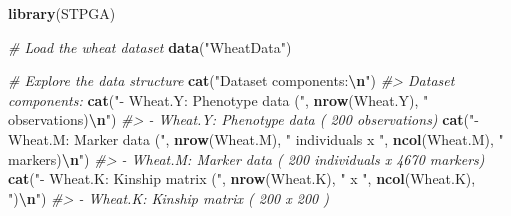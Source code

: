 \documentclass[
]{article}
\newenvironment{Shaded}{\begin{snugshade}}{\end{snugshade}}
\newcommand{\CommentTok}[1]{\textcolor[rgb]{0.56,0.35,0.01}{\textit{#1}}}
\newcommand{\FunctionTok}[1]{\textcolor[rgb]{0.13,0.29,0.53}{\textbf{#1}}}
\newcommand{\NormalTok}[1]{#1}
\newcommand{\SpecialCharTok}[1]{\textcolor[rgb]{0.81,0.36,0.00}{\textbf{#1}}}
\newcommand{\StringTok}[1]{\textcolor[rgb]{0.31,0.60,0.02}{#1}}
\begin{document}
\begin{Shaded}
\begin{Highlighting}[]
\FunctionTok{library}\NormalTok{(STPGA)}

\CommentTok{\# Load the wheat dataset}
\FunctionTok{data}\NormalTok{(}\StringTok{"WheatData"}\NormalTok{)}

\CommentTok{\# Explore the data structure}
\FunctionTok{cat}\NormalTok{(}\StringTok{"Dataset components:}\SpecialCharTok{\textbackslash{}n}\StringTok{"}\NormalTok{)}
\CommentTok{\#\textgreater{} Dataset components:}
\FunctionTok{cat}\NormalTok{(}\StringTok{"{-} Wheat.Y: Phenotype data ("}\NormalTok{, }\FunctionTok{nrow}\NormalTok{(Wheat.Y), }\StringTok{" observations)}\SpecialCharTok{\textbackslash{}n}\StringTok{"}\NormalTok{)}
\CommentTok{\#\textgreater{} {-} Wheat.Y: Phenotype data ( 200  observations)}
\FunctionTok{cat}\NormalTok{(}\StringTok{"{-} Wheat.M: Marker data ("}\NormalTok{, }\FunctionTok{nrow}\NormalTok{(Wheat.M), }\StringTok{" individuals x "}\NormalTok{, }\FunctionTok{ncol}\NormalTok{(Wheat.M), }\StringTok{" markers)}\SpecialCharTok{\textbackslash{}n}\StringTok{"}\NormalTok{)}
\CommentTok{\#\textgreater{} {-} Wheat.M: Marker data ( 200  individuals x  4670  markers)}
\FunctionTok{cat}\NormalTok{(}\StringTok{"{-} Wheat.K: Kinship matrix ("}\NormalTok{, }\FunctionTok{nrow}\NormalTok{(Wheat.K), }\StringTok{" x "}\NormalTok{, }\FunctionTok{ncol}\NormalTok{(Wheat.K), }\StringTok{")}\SpecialCharTok{\textbackslash{}n}\StringTok{"}\NormalTok{)}
\CommentTok{\#\textgreater{} {-} Wheat.K: Kinship matrix ( 200  x  200 )}
\end{Highlighting}
\end{Shaded}
\end{document}
